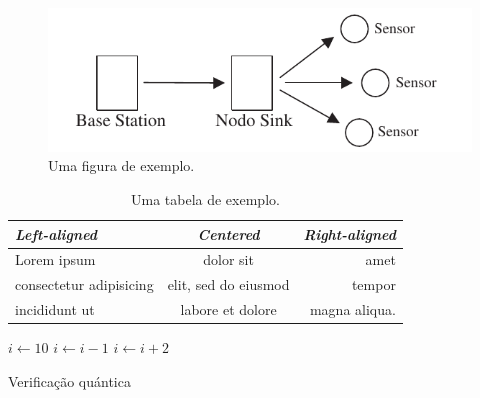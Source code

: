 \documentclass[phd,oneside]{ppgccufmg}  %
\begin{document}
\dummytxtb\dummytxta\dummytxtc

\begin{figure}[t]
    \centering
    \includegraphics{img/exemplo}
    \caption{Uma figura de exemplo.}
    \label{fig:exemplo}
\end{figure}

\dummytxtb\dummytxta\dummytxtc\dummytxtb

\begin{table}[t]
    \caption{Uma tabela de exemplo.}
    {\centering
    \begin{tabular}{lcr} \toprule
    \emph{Left-aligned} & \emph{Centered} & \emph{Right-aligned} \\ \midrule
    Lorem ipsum & dolor sit & amet \\
    consectetur adipisicing & elit, sed do eiusmod & tempor \\
    incididunt ut & labore et dolore & magna aliqua. \\ \bottomrule
    \end{tabular}\par
    }
\end{table}


\begin{algorithm}
	$i\gets 10$\;
	{
		$i\gets i-1$\;
	}{
		{
			$i\gets i+2$\;
		}
	}
	\caption{Verificação quántica}
	\label{alg:frontier}
\end{algorithm}

\end{document}
